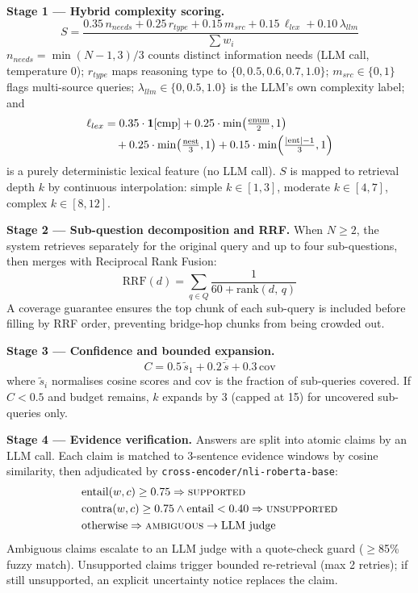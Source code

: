 \documentclass[conference]{IEEEtran}
\begin{document}
\textbf{Stage 1 --- Hybrid complexity scoring.}
\begin{equation}
S = \frac{0.35\,n_{\!needs} + 0.25\,r_{type} + 0.15\,m_{src} + 0.15\,\ell_{lex} + 0.10\,\lambda_{llm}}{\sum w_i}
\label{eq:complexity}
\end{equation}
$n_{needs}\!=\!\min(N\!-\!1,3)/3$ counts distinct information needs (LLM call, temperature 0);
$r_{type}$ maps reasoning type to $\{0, 0.5, 0.6, 0.7, 1.0\}$; $m_{src}\!\in\!\{0,1\}$ flags
multi-source queries; $\lambda_{llm}\!\in\!\{0, 0.5, 1.0\}$ is the LLM's own complexity label;
and
\begin{align}
\ell_{lex} &= 0.35\cdot\mathbf{1}[\text{cmp}] + 0.25\cdot\min\!\left(\tfrac{\text{enum}}{2},1\right) \notag\\
           &\quad + 0.25\cdot\min\!\left(\tfrac{\text{nest}}{3},1\right) + 0.15\cdot\min\!\left(\tfrac{|\text{ent}|-1}{3},1\right)
\label{eq:lexical}
\end{align}
is a purely deterministic lexical feature (no LLM call). $S$ is mapped to retrieval depth $k$ by
continuous interpolation: simple $k\!\in\![1,3]$, moderate $k\!\in\![4,7]$, complex $k\!\in\![8,12]$.

\textbf{Stage 2 --- Sub-question decomposition and RRF.}
When $N\!\geq\!2$, the system retrieves separately for the original query and up to four
sub-questions, then merges with Reciprocal Rank Fusion:
\begin{equation}
  \text{RRF}(d) = \textstyle\sum_{q \in Q} \frac{1}{60 + \text{rank}(d,\,q)}
  \label{eq:rrf}
\end{equation}
A coverage guarantee ensures the top chunk of each sub-query is included before filling by RRF
order, preventing bridge-hop chunks from being crowded out.

\textbf{Stage 3 --- Confidence and bounded expansion.}
\begin{equation}
  C = 0.5\,\tilde{s}_1 + 0.2\,\overline{\tilde{s}} + 0.3\,\text{cov}
  \label{eq:confidence}
\end{equation}
where $\tilde{s}_i$ normalises cosine scores and $\text{cov}$ is the fraction of sub-queries
covered. If $C < 0.5$ and budget remains, $k$ expands by 3 (capped at 15) for uncovered
sub-queries only.

\textbf{Stage 4 --- Evidence verification.}
Answers are split into atomic claims by an LLM call. Each claim is matched to 3-sentence evidence
windows by cosine similarity, then adjudicated by \texttt{cross-encoder/nli-roberta-base}:
\begin{align}
&\text{entail}(w,c)\geq 0.75 \Rightarrow \textsc{supported} \notag \\
&\text{contra}(w,c)\geq 0.75 \wedge \text{entail}<0.40 \Rightarrow \textsc{unsupported} \notag \\
&\text{otherwise} \Rightarrow \textsc{ambiguous} \to \text{LLM judge}
\label{eq:nli}
\end{align}
Ambiguous claims escalate to an LLM judge with a quote-check guard ($\geq$85\% fuzzy match).
Unsupported claims trigger bounded re-retrieval (max 2 retries); if still unsupported, an
explicit uncertainty notice replaces the claim.
\end{document}
